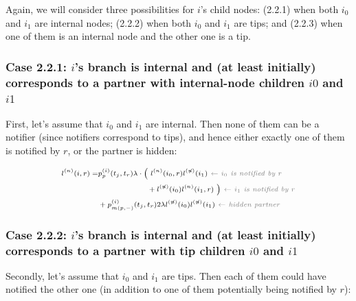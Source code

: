 \documentclass[10pt,letterpaper]{article}
\begin{document}
Again, we will consider three possibilities for $i$'s child nodes: (2.2.1) when both $i_0$ and $i_1$ are internal nodes; (2.2.2) when both $i_0$ and $i_1$ are tips; and (2.2.3) when one of them is an internal node and the other one is a tip.


\subsubsection*{Case 2.2.1: $i$'s branch is internal and (at least initially) corresponds to a partner with internal-node children $i0$ and $i1$} 

First, let's assume that $i_0$ and $i_1$ are internal. Then none of them can be a notifier (since notifiers correspond to tips), and hence either exactly one of them is notified by $r$, or the partner is hidden:

\begin{equation}
\scriptsize
\begin{split}
l^{(n)}(i, r) = &p_{p}^{(i)}(t_j, t_r) \lambda \cdot
\Big(~l^{(n)}(i_0,r)l^{(\not{n})}(i_1) \textit{\color{gray}~$\leftarrow$ $i_0$ is notified by $r$} \\
& ~~~~~~~~~~~~~~~~~~~+ l^{(\not{n})}(i_0)l^{(n)}(i_1,r)~\Big) \textit{\color{gray}~$\leftarrow$ $i_1$ is notified by $r$} \\
& + p_{m(p,-)}^{(i)}(t_j,t_r) 2 \lambda l^{(\not{n})}(i_0)l^{(\not{n})}(i_1) \textit{\color{gray}~$\leftarrow$ hidden partner}\\
 \end{split}
\label{eq:lp-int-int}
\end{equation}

\subsubsection*{Case 2.2.2: $i$'s branch is internal and (at least initially) corresponds to a partner with tip children $i0$ and $i1$} 
Secondly, let's assume that $i_0$ and $i_1$ are tips. Then each of them could have notified the other one (in addition to one of them potentially being notified by $r$):
\end{document}
